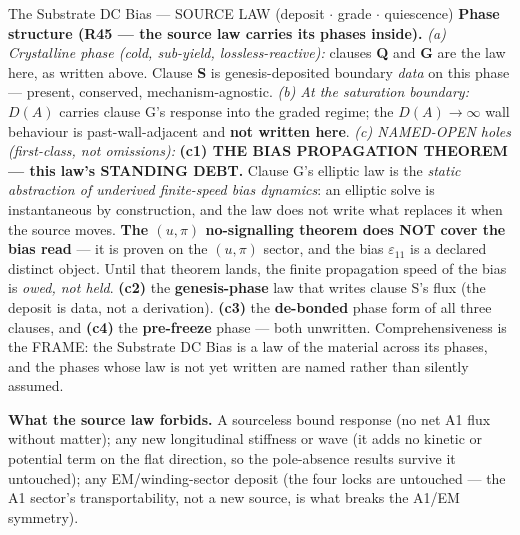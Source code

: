 \begin{resultbox}{The Substrate DC Bias — SOURCE LAW (deposit $\cdot$ grade $\cdot$ quiescence)}
\medskip\noindent\textbf{Phase structure (R45 --- the source law carries its phases inside).} \emph{(a) Crystalline phase (cold, sub-yield, lossless-reactive):} clauses \textbf{Q} and \textbf{G} are the law here, as written above. Clause \textbf{S} is genesis-deposited boundary \emph{data} on this phase --- present, conserved, mechanism-agnostic. \emph{(b) At the saturation boundary:} $D(A)$ carries clause G's response into the graded regime; the $D(A)\to\infty$ wall behaviour is past-wall-adjacent and \textbf{not written here}. \emph{(c) NAMED-OPEN holes (first-class, not omissions):} \textbf{(c1) THE BIAS PROPAGATION THEOREM --- this law's STANDING DEBT.} Clause G's elliptic law is the \emph{static abstraction of underived finite-speed bias dynamics}: an elliptic solve is instantaneous by construction, and the law does not write what replaces it when the source moves. \textbf{The $(u,\pi)$ no-signalling theorem does NOT cover the bias read} --- it is proven on the $(u,\pi)$ sector, and the bias $\varepsilon_{11}$ is a declared distinct object. Until that theorem lands, the finite propagation speed of the bias is \emph{owed, not held}. \textbf{(c2)} the \textbf{genesis-phase} law that writes clause S's flux (the deposit is data, not a derivation). \textbf{(c3)} the \textbf{de-bonded} phase form of all three clauses, and \textbf{(c4)} the \textbf{pre-freeze} phase --- both unwritten. Comprehensiveness is the FRAME: the Substrate DC Bias is a law of the material across its phases, and the phases whose law is not yet written are named rather than silently assumed.

\medskip\noindent\textbf{What the source law forbids.} A sourceless bound response (no net A1 flux without matter); any new longitudinal stiffness or wave (it adds no kinetic or potential term on the flat direction, so the pole-absence results survive it untouched); any EM/winding-sector deposit (the four locks are untouched --- the A1 sector's transportability, not a new source, is what breaks the A1/EM symmetry).
\end{resultbox}
%
